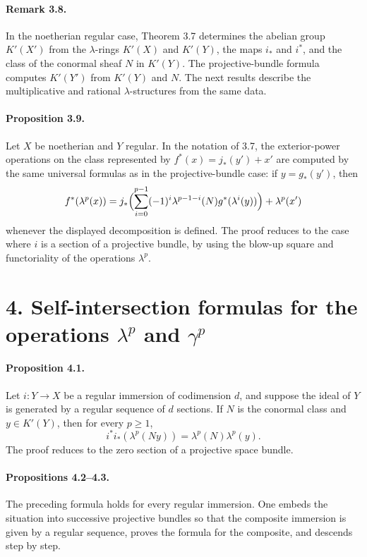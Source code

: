 \documentclass[11pt]{article}
\theoremstyle{plain}
\theoremstyle{definition}
\theoremstyle{remark}
\begin{document}
\paragraph{Remark 3.8.} In the noetherian regular case, Theorem 3.7 determines the abelian group $K'(X')$ from the $\lambda$-rings $K'(X)$ and $K'(Y)$, the maps $i_*$ and $i^*$, and the class of the conormal sheaf $N$ in $K'(Y)$. The projective-bundle formula computes $K'(Y')$ from $K'(Y)$ and $N$. The next results describe the multiplicative and rational $\lambda$-structures from the same data.

\paragraph{Proposition 3.9.} Let $X$ be noetherian and $Y$ regular. In the notation of 3.7, the exterior-power operations on the class represented by $f^*(x)=j_*(y')+x'$ are computed by the same universal formulas as in the projective-bundle case: if $y=g_*(y')$, then
\[
f^*(\lambda^p(x))=j_*\Bigl(\sum_{i=0}^{p-1}(-1)^i\lambda^{p-1-i}(N)g^*(\lambda^i(y))\Bigr)+\lambda^p(x')
\]
whenever the displayed decomposition is defined. The proof reduces to the case where $i$ is a section of a projective bundle, by using the blow-up square and functoriality of the operations $\lambda^p$.

\section*{4. Self-intersection formulas for the operations $\lambda^p$ and $\gamma^p$}

\paragraph{Proposition 4.1.} Let $i:Y\to X$ be a regular immersion of codimension $d$, and suppose the ideal of $Y$ is generated by a regular sequence of $d$ sections. If $N$ is the conormal class and $y\in K'(Y)$, then for every $p\geq1$,
\[
i^*i_*(\lambda^p(Ny))=\lambda^p(N)\lambda^p(y).
\]
The proof reduces to the zero section of a projective space bundle.

\paragraph{Propositions 4.2--4.3.} The preceding formula holds for every regular immersion. One embeds the situation into successive projective bundles so that the composite immersion is given by a regular sequence, proves the formula for the composite, and descends step by step.
\end{document}
